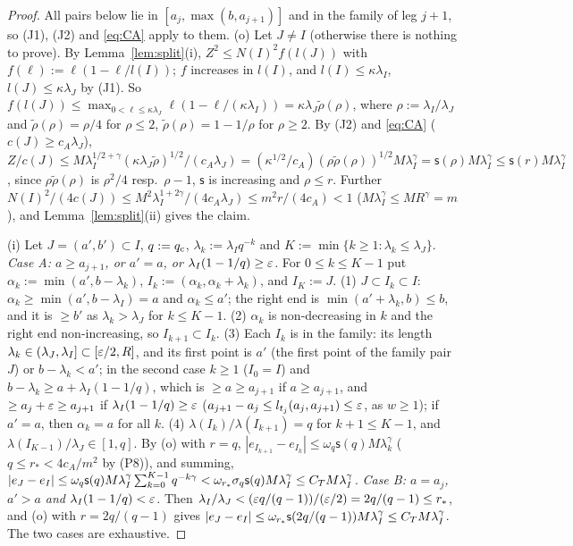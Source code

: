 \begin{proof}
All pairs below lie in $[a_j,\max(b,a_{j+1})]$ and in the family of leg $j+1$, so (J1), (J2) and \eqref{eq:CA} apply to them.
(o) Let $J\ne I$ (otherwise there is nothing to prove). By Lemma~\ref{lem:split}(i), $Z^2\le N(I)^2f(l(J))$ with
$f(\ell):=\ell(1-\ell/l(I))$; $f$ increases in $l(I)$, and $l(I)\le\kappa\lambda_I$, $l(J)\le\kappa\lambda_J$ by (J1). So
$f(l(J))\le\max_{0<\ell\le\kappa\lambda_J}\ell(1-\ell/(\kappa\lambda_I))=\kappa\lambda_J\tilde\rho(\rho)$, where $\rho:=\lambda_I/\lambda_J$
and $\tilde\rho(\rho)=\rho/4$ for $\rho\le2$, $\tilde\rho(\rho)=1-1/\rho$ for $\rho\ge2$. By (J2) and \eqref{eq:CA} ($c(J)\ge c_A\lambda_J$),
$Z/c(J)\le M\lambda_I^{1/2+\gamma}(\kappa\lambda_J\tilde\rho)^{1/2}/(c_A\lambda_J)=(\kappa^{1/2}/c_A)(\rho\tilde\rho(\rho))^{1/2}M\lambda_I^\gamma
=\mathsf s(\rho)M\lambda_I^\gamma\le\mathsf s(r)M\lambda_I^\gamma$, since $\rho\tilde\rho(\rho)$ is $\rho^2/4$ resp.\ $\rho-1$, $\mathsf s$ is increasing and
$\rho\le r$. Further $N(I)^2/(4c(J))\le M^2\lambda_I^{1+2\gamma}/(4c_A\lambda_J)\le m^2r/(4c_A)<1$ ($M\lambda_I^\gamma\le MR^\gamma=m$),
and Lemma~\ref{lem:split}(ii) gives the claim.

(i) Let $J=(a',b')\subset I$, $q:=q_{\mathrm c}$, $\lambda_k:=\lambda_Iq^{-k}$ and $K:=\min\{k\ge1:\lambda_k\le\lambda_J\}$.
\emph{Case A: $a\ge a_{j+1}$, or $a'=a$, or $\lambda_I(1-1/q)\ge\varepsilon$.} For $0\le k\le K-1$ put $\alpha_k:=\min(a',b-\lambda_k)$,
$I_k:=(\alpha_k,\alpha_k+\lambda_k)$, and $I_K:=J$. (1) $J\subset I_k\subset I$: $\alpha_k\ge\min(a',b-\lambda_I)=a$ and $\alpha_k\le a'$; the
right end is $\min(a'+\lambda_k,b)\le b$, and it is $\ge b'$ as $\lambda_k>\lambda_J$ for $k\le K-1$. (2) $\alpha_k$ is non-decreasing in $k$
and the right end non-increasing, so $I_{k+1}\subset I_k$. (3) Each $I_k$ is in the family: its length $\lambda_k\in(\lambda_J,\lambda_I]
\subset[\varepsilon/2,R]$, and its first point is $a'$ (the first point of the family pair $J$) or $b-\lambda_k<a'$; in the second case $k\ge1$
($I_0=I$) and $b-\lambda_k\ge a+\lambda_I(1-1/q)$, which is $\ge a\ge a_{j+1}$ if $a\ge a_{j+1}$, and $\ge a_j+\varepsilon\ge a_{j+1}$ if
$\lambda_I(1-1/q)\ge\varepsilon$ ($a_{j+1}-a_j\le l_{t_j}(a_j,a_{j+1})\le\varepsilon$, as $w\ge1$); if $a'=a$, then $\alpha_k=a$ for all $k$.
(4) $\lambda(I_k)/\lambda(I_{k+1})=q$ for $k+1\le K-1$, and $\lambda(I_{K-1})/\lambda_J\in[1,q]$. By (o) with $r=q$,
$|e_{I_{k+1}}-e_{I_k}|\le\omega_q\mathsf s(q)M\lambda_k^\gamma$ ($q\le r_*<4c_A/m^2$ by (P8)), and summing,
$|e_J-e_I|\le\omega_q\mathsf s(q)M\lambda_I^\gamma\sum_{k=0}^{K-1}q^{-k\gamma}<\omega_{r_*}\sigma_q\mathsf s(q)M\lambda_I^\gamma\le C_T M\lambda_I^\gamma$.
\emph{Case B: $a=a_j$, $a'>a$ and $\lambda_I(1-1/q)<\varepsilon$.} Then $\lambda_I/\lambda_J<(\varepsilon q/(q-1))/(\varepsilon/2)=2q/(q-1)\le r_*$, and
(o) with $r=2q/(q-1)$ gives $|e_J-e_I|\le\omega_{r_*}\mathsf s(2q/(q-1))M\lambda_I^\gamma\le C_T M\lambda_I^\gamma$. The two cases are exhaustive.


\end{proof}
